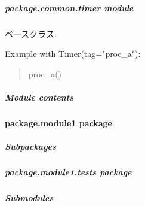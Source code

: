 \documentclass[letterpaper,10pt,dvipdfmx]{sphinxmanual}
\begin{document}
\sphinxstepscope


\subparagraph{package.common.timer module}
\label{\detokenize{package.common.timer:module-package.common.timer}}\label{\detokenize{package.common.timer:package-common-timer-module}}\label{\detokenize{package.common.timer::doc}}

\begin{fulllineitems}
\label{\detokenize{package.common.timer:package.common.timer.Timer}}
\pysigstartsignatures
{}
\pysigstopsignatures
\sphinxAtStartPar
ベースクラス: 

\sphinxAtStartPar
Example
with Timer(tag="proc\_a"):
\begin{quote}

\sphinxAtStartPar
proc\_a()
\end{quote}

\end{fulllineitems}



\subparagraph{Module contents}
\label{\detokenize{package.common:module-package.common}}\label{\detokenize{package.common:module-contents}}
\sphinxstepscope


\paragraph{package.module1 package}
\label{\detokenize{package.module1:package-module1-package}}\label{\detokenize{package.module1::doc}}

\subparagraph{Subpackages}
\label{\detokenize{package.module1:subpackages}}
\sphinxstepscope


\subparagraph{package.module1.tests package}
\label{\detokenize{package.module1.tests:package-module1-tests-package}}\label{\detokenize{package.module1.tests::doc}}

\subparagraph{Submodules}
\label{\detokenize{package.module1.tests:submodules}}
\sphinxstepscope
\end{document}
